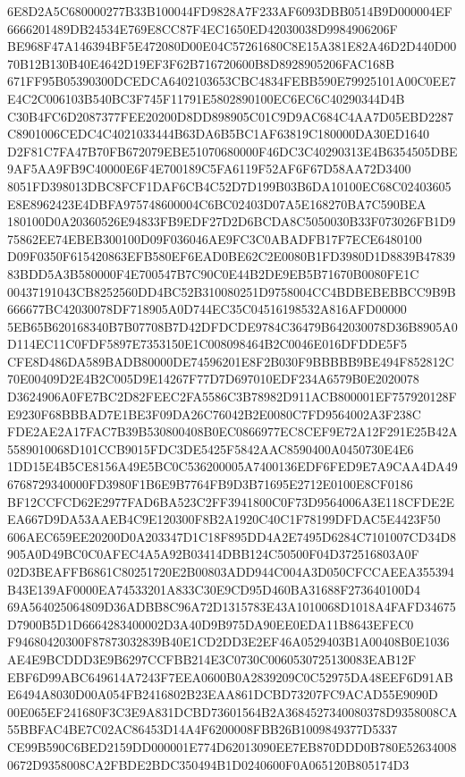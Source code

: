\documentclass[UTF8,fontset=fandol,zihao=-4,a4paper]{ctexart}
\begin{document}
{{6E8D2A5C680000277B33B100044FD9828A7F233AF6093DBB0514B9D000004EF6666201489DB24534E769E8CC87F4EC1650ED42030038D9984906206F
BE968F47A146394BF5E472080D00E04C57261680C8E15A381E82A46D2D440D0070B12B130B40E4642D19EF3F62B716720600B8D8928905206FAC168B
671FF95B05390300DCEDCA6402103653CBC4834FEBB590E79925101A00C0EE7E4C2C006103B540BC3F745F11791E5802890100EC6EC6C40290344D4B
C30B4FC6D2087377FEE20200D8DD898905C01C9D9AC684C4AA7D05EBD2287C8901006CEDC4C4021033444B63DA6B5BC1AF63819C180000DA30ED1640
D2F81C7FA47B70FB672079EBE51070680000F46DC3C40290313E4B6354505DBE9AF5AA9FB9C40000E6F4E700189C5FA6119F52AF6F67D58AA72D3400
8051FD398013DBC8FCF1DAF6CB4C52D7D199B03B6DA10100EC68C02403605E8E8962423E4DBFA975748600004C6BC02403D07A5E168270BA7C590BEA
180100D0A20360526E94833FB9EDF27D2D6BCDA8C5050030B33F073026FB1D975862EE74EBEB300100D09F036046AE9FC3C0ABADFB17F7ECE6480100
D09F0350F615420863EFB580EF6EAD0BE62C2E0080B1FD3980D1D8839B4783983BDD5A3B580000F4E700547B7C90C0E44B2DE9EB5B71670B0080FE1C
00437191043CB8252560DD4BC52B310080251D9758004CC4BDBEBEBBCC9B9B666677BC42030078DF718905A0D744EC35C04516198532A816AFD00000
5EB65B620168340B7B07708B7D42DFDCDE9784C36479B642030078D36B8905A0D114EC11C0FDF5897E7353150E1C008098464B2C0046E016DFDDE5F5
CFE8D486DA589BADB80000DE74596201E8F2B030F9BBBBB9BE494F852812C70E00409D2E4B2C005D9E14267F77D7D697010EDF234A6579B0E2020078
D3624906A0FE7BC2D82FEEC2FA5586C3B78982D911ACB800001EF757920128FE9230F68BBBAD7E1BE3F09DA26C76042B2E0080C7FD9564002A3F238C
FDE2AE2A17FAC7B39B530800408B0EC0866977EC8CEF9E72A12F291E25B42A5589010068D101CCB9015FDC3DE5425F5842AAC8590400A0450730E4E6
1DD15E4B5CE8156A49E5BC0C536200005A7400136EDF6FED9E7A9CAA4DA496768729340000FD3980F1B6E9B7764FB9D3B71695E2712E0100E8CF0186
BF12CCFCD62E2977FAD6BA523C2FF3941800C0F73D9564006A3E118CFDE2EEA667D9DA53AAEB4C9E120300F8B2A1920C40C1F78199DFDAC5E4423F50
606AEC659EE20200D0A203347D1C18F895DD4A2E7495D6284C7101007CD34D8905A0D49BC0C0AFEC4A5A92B03414DBB124C50500F04D372516803A0F
02D3BEAFFB6861C80251720E2B00803ADD944C004A3D050CFCCAEEA355394B43E139AF0000EA74533201A833C30E9CD95D460BA31688F273640100D4
69A564025064809D36ADBB8C96A72D1315783E43A1010068D1018A4FAFD34675D7900B5D1D6664283400002D3A40D9B975DA90EE0EDA11B8643EFEC0
F94680420300F87873032839B40E1CD2DD3E2EF46A0529403B1A00408B0E1036AE4E9BCDDD3E9B6297CCFBB214E3C0730C0060530725130083EAB12F
EBF6D99ABC649614A7243F7EEA0600B0A2839209C0C52975DA48EEF6D91ABE6494A8030D00A054FB2416802B23EAA861DCBD73207FC9ACAD55E9090D
00E065EF241680F3C3E9A831DCBD73601564B2A3684527340080378D9358008CA55BBFAC4BE7C02AC86453D14A4F6200008FBB26B1009849377D5337
CE99B590C6BED2159DD000001E774D62013090EE7EB870DDD0B780E526340080672D9358008CA2FBDE2BDC350494B1D0240600F0A065120B805174D3
}}
\end{document}
